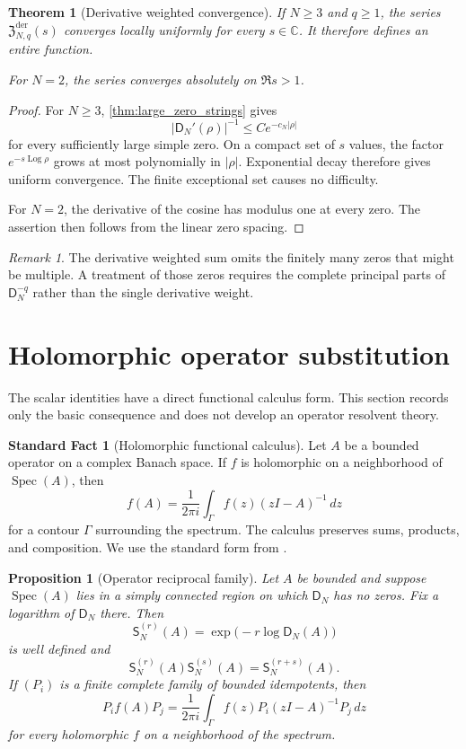 \documentclass{aomart}
\newtheorem{theorem}{Theorem}[section]
\newtheorem{proposition}[proposition]{Proposition}
\theoremstyle{definition}
\newtheorem{standardfact}[standardfact]{Standard Fact}
\theoremstyle{remark}
\newtheorem{remark}[remark]{Remark}
\newcommand{\CC}{\mathbb C}
\newcommand{\Dfun}{\mathsf D}
\newcommand{\Sfun}{\mathsf S}
\newcommand{\Spec}{\operatorname{Spec}}
\newcommand{\Log}{\operatorname{Log}}
\begin{document}
\begin{theorem}[Derivative weighted convergence]\label{thm:derivative_weighted_convergence}
If $N\geq3$ and $q\geq1$, the series $\mathfrak Z_{N,q}^{\mathrm{der}}(s)$ converges locally uniformly for every $s\in\CC$.  It therefore defines an entire function.

For $N=2$, the series converges absolutely on $\Re s>1$.
\end{theorem}

\begin{proof}
For $N\geq3$, \cref{thm:large_zero_strings} gives
\[
|\Dfun_N'(\rho)|^{-1}
\leq
C e^{-c_N|\rho|}
\]
for every sufficiently large simple zero.  On a compact set of $s$ values, the factor $e^{-s\Log\rho}$ grows at most polynomially in $|\rho|$.  Exponential decay therefore gives uniform convergence.  The finite exceptional set causes no difficulty.

For $N=2$, the derivative of the cosine has modulus one at every zero.  The assertion then follows from the linear zero spacing.
\end{proof}

\begin{remark}\label{rem:multiple_zeros}
The derivative weighted sum omits the finitely many zeros that might be multiple.  A treatment of those zeros requires the complete principal parts of $\Dfun_N^{-q}$ rather than the single derivative weight.
\end{remark}

\section{Holomorphic operator substitution}\label{sec:operator_substitution}

The scalar identities have a direct functional calculus form.  This section records only the basic consequence and does not develop an operator resolvent theory.

\begin{standardfact}[Holomorphic functional calculus]\label{sf:holomorphic_calculus}
Let $A$ be a bounded operator on a complex Banach space.  If $f$ is holomorphic on a neighborhood of $\Spec(A)$, then
\[
f(A)
=
\frac1{2\pi i}\int_\Gamma f(z)(zI-A)^{-1}\,dz
\]
for a contour $\Gamma$ surrounding the spectrum.  The calculus preserves sums, products, and composition.  We use the standard form from \cite{DunfordSchwartz1958}.
\end{standardfact}

\begin{proposition}[Operator reciprocal family]\label{prop:operator_reciprocal}
Let $A$ be bounded and suppose $\Spec(A)$ lies in a simply connected region on which $\Dfun_N$ has no zeros.  Fix a logarithm of $\Dfun_N$ there.  Then
\[
\Sfun_N^{(r)}(A)
=
\exp\bigl(-r\log\Dfun_N(A)\bigr)
\]
is well defined and
\[
\Sfun_N^{(r)}(A)\Sfun_N^{(s)}(A)
=
\Sfun_N^{(r+s)}(A).
\]
If $(P_i)$ is a finite complete family of bounded idempotents, then
\[
P_i f(A)P_j
=
\frac1{2\pi i}
\int_\Gamma
f(z)P_i(zI-A)^{-1}P_j\,dz
\]
for every holomorphic $f$ on a neighborhood of the spectrum.
\end{proposition}
\end{document}
